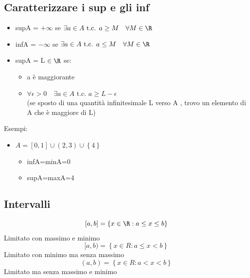\subsection{Caratterizzare i sup e gli inf}
\begin{itemize}
	\item supA = $ + \infty$ se $ \exists a  \in A \text{ t.c. } a\ge M \quad \forall M  \in  \R$
	\item infA = $- \infty$ se $ \exists a  \in  A \text{ t.c. } a \le M \quad \forall M  \in \R$
	\item supA = L $  \in \R$ se:
	      \begin{itemize}
		      \item a è maggiorante
		      \item $ \forall \epsilon > 0 \quad \exists a  \in  A \text{ t.c. } a \ge L-\epsilon$ \\(se sposto di una quantità infinitesimale L verso A , trovo un elemento di A che è maggiore di L)
	      \end{itemize}
\end{itemize}
%
\hr
%
Esempi:
\begin{itemize}
	\item $A = [0,1]  \cup \left( 2,3 \right)  \cup \left\{ 4 \right\} $
	      \begin{itemize}
		      \item infA=minA=0
		      \item supA=maxA=4
	      \end{itemize}
\end{itemize}
\subsection{Intervalli}
\label{sec:dd}
\[
	\left[ a,b \right] = \left\{ x  \in  \R : a \le x \le b \right\}
\]
Limitato con massimo e minimo
\[
	[a,b) = \left\{ x  \in R : a \le x < b \right\}
\]
Limitato con minimo ma senza massimo
\[
	\left( a,b \right) = \left\{ x  \in  R : a<x<b \right\}
\]
Limitato ma senza massimo e minimo

